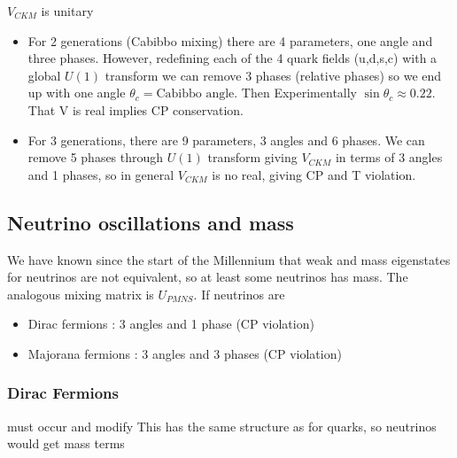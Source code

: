 \documentclass{article}
\begin{document}
$V_{CKM}$ is unitary 
\begin{itemize}
    \item For 2 generations (Cabibbo mixing) there are 4 parameters, one angle and three phases. However, redefining each of the 4 quark fields (u,d,s,c) with a global $U(1)$ transform we can remove 3 phases (relative phases) so we end up with one angle $\theta_c = \text{Cabibbo angle}$. Then 
    Experimentally $\sin\theta_c \approx 0.22$. That V is real implies CP conservation. 
    \item For 3 generations, there are 9 parameters, 3 angles and 6 phases. We can remove 5 phases through $U(1)$ transform giving $V_{CKM}$ in terms of 3 angles and 1 phases, so in general $V_{CKM} $ is no real, giving CP and T violation. 
\end{itemize}

\subsection{Neutrino oscillations and mass}
We have known since the start of the Millennium that weak and mass eigenstates for neutrinos are not equivalent, so at least some neutrinos has mass. The analogous mixing matrix is $U_{PMNS}$. If neutrinos are 
\begin{itemize}
    \item Dirac fermions : 3 angles and 1 phase (CP violation) 
    \item Majorana fermions : 3 angles and 3 phases (CP violation)
\end{itemize}

\subsubsection*{Dirac Fermions }
must occur and modify 
This has the same structure as for quarks, so neutrinos would get mass terms 
\end{document}

